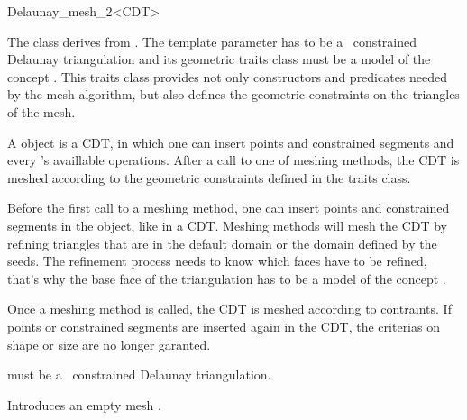 \begin{ccRefClass}{Delaunay_mesh_2<CDT>}

The class \ccRefName{} derives from
. The template parameter
 has to be a \cgal\ constrained Delaunay triangulation and its
geometric traits class must be a model of the concept
. This traits class provides not only
constructors and predicates needed by the mesh algorithm, but also defines
the geometric constraints on the triangles of the mesh.

A \ccRefName{} object is a  CDT, in which one can insert points
and constrained segments and every 's availlable operations. After
a call to one of meshing methods, the CDT is meshed according to the
geometric constraints defined in the traits class.

Before the first call to a meshing method, one can insert points and
constrained segments in the \ccRefName{} object, like in a CDT. Meshing
methods will mesh the CDT by refining triangles that are in the default
domain or the domain defined by the seeds. The refinement process needs to
know which faces have to be refined, that's why the base face of the
triangulation  has to be a model of the concept
.

Once a meshing method is called, the CDT is meshed according to
contraints. If points or constrained segments are inserted again in
the CDT, the criterias on shape or size are no longer garanted.


\ccInheritsFrom


\ccParameters

 must be a \cgal\ constrained Delaunay triangulation.

\ccTypes 
{}

\ccCreation
{}

{Introduces an empty mesh \ccVar.}


\end{ccRefClass}
